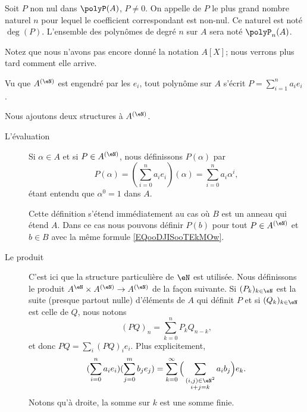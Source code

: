 \begin{definition}  \label{DefDegrePoly}
    Soit \( P\) non nul dans \(\polyP(A)\), \( P \neq 0 \). On appelle  de $P$ le plus grand nombre naturel $n$ pour lequel le coefficient correspondant est non-nul. Ce naturel est noté \( \deg(P) \). L'ensemble des polynômes de degré \( n\) sur \( A\) sera noté \( \polyP_n(A)\).
\end{definition}

Notez que nous n'avons pas encore donné la notation \( A[X]\); nous verrons plus tard comment elle arrive. 

Vu que \( A^{(\eN)}\) est engendré par les \( e_i\), tout polynôme sur \( A\) s'écrit \( P=\sum_{i=1}^na_ie_i\).

\begin{definition}      \label{DEFooNXKUooLrGeuh}
    Nous ajoutons deux structures à \( A^{(\eN)}\).
    \begin{description}
        \item[L'évaluation] Si \( \alpha\in A\) et si \( P\in A^{(\eN)}\), nous définissons \( P(\alpha)\) par
            \begin{equation}        \label{EQooDJISooTEkMOw}
                P(\alpha)=(\sum_{i=0}^{n}a_ie_i)(\alpha)=\sum_{i=0}^na_i\alpha^i,
            \end{equation}
            étant entendu que \( \alpha^0=1\) dans \( A\).

            Cette définition s'étend immédiatement au cas où \( B\) est un anneau qui étend \( A\). Dans ce cas nous pouvons définir \( P(b)\) pour tout \( P\in A^{(\eN)}\) et \( b\in B\) avec la même formule \eqref{EQooDJISooTEkMOw}.
        \item[Le produit] C'est ici que la structure particulière de \( \eN\) est utilisée. Nous définissons le produit \( A^{\eN}\times A^{(\eN)}\to A^{(\eN)}\) de la façon suivante. Si \( (P_k)_{k\in \eN}\) est la suite (presque partout nulle) d'éléments de \( A\) qui définit \( P\) et si \( (Q_k)_{k\in \eN}\) est celle de \( Q\), nous notons
        \begin{equation}    \label{EQooTNCSooKklisb}
            (PQ)_n=\sum_{k=0}^nP_kQ_{n-k},
        \end{equation}
        et donc \( PQ=\sum_i(PQ)_ie_i\). Plus explicitement,
        \begin{equation}    \label{EQooCIBUooAgpxjL}
            (\sum_{i=0}^na_ie_i)(\sum_{j=0}^mb_je_j)=\sum_{k=0}^{\infty}\Big( \sum_{\substack{  (i,j)\in \eN^2 \\i+j=k}}a_ib_j \Big)e_k.
        \end{equation}
        Notons qu'à droite, la somme sur \( k\) est une somme finie.
    \end{description}
\end{definition}

